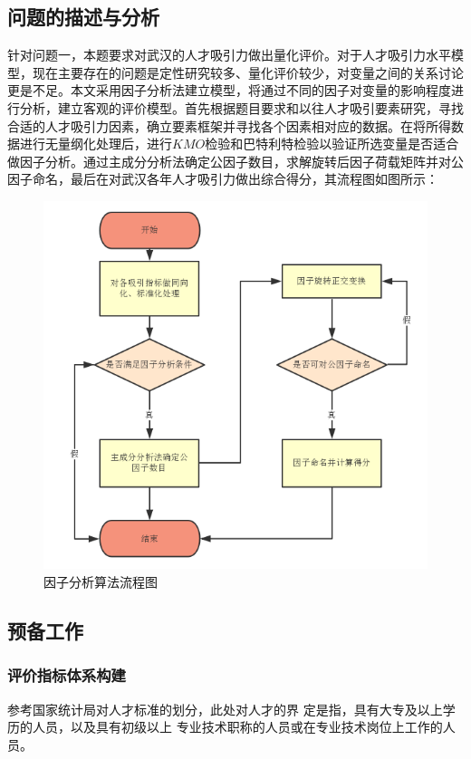 \documentclass{whutmod}
\begin{document}
	\subsection{问题的描述与分析}
	针对问题一，本题要求对武汉的人才吸引力做出量化评价。对于人才吸引力水平模型，现在主要存在的问题是定性研究较多、量化评价较少，对变量之间的关系讨论更是不足。本文采用因子分析法建立模型，将通过不同的因子对变量的影响程度进行分析，建立客观的评价模型。首先根据题目要求和以往人才吸引要素研究，寻找合适的人才吸引力因素，确立要素框架并寻找各个因素相对应的数据。在将所得数据进行无量纲化处理后，进行$KMO$检验和巴特利特检验以验证所选变量是否适合做因子分析。通过主成分分析法确定公因子数目，求解旋转后因子荷载矩阵并对公因子命名，最后在对武汉各年人才吸引力做出综合得分，其流程图如图\label{llll}所示：

	\begin{figure}[H]
		\centering
		\includegraphics[width=\textwidth]{figures/1111.png}
		\caption{因子分析算法流程图}\label{llll}
	\end{figure}

		\subsection{预备工作}
		\subsubsection{评价指标体系构建}
		参考国家统计局对人才标准的划分，此处对人才的界 定是指，具有大专及以上学历的人员，以及具有初级以上 专业技术职称的人员或在专业技术岗位上工作的人员。
		
\end{document}
